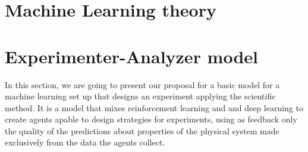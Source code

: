\documentclass[11pt,a4paper,twoside]{report}
\newcommand{\+}{\textnormal{+} }
\theoremstyle{definition}
\numberwithin{equation}{chapter}
\begin{document}
\chapter{Machine Learning theory} 

\chapter{Experimenter-Analyzer model}
In this section, we are going to present our proposal for a basic model for a
machine learning set up that designs an experiment applying the scientific 
method. It is a model that mixes reinforcement learning and and deep learning to
create agents apable to design strategies for experiments, using as feedback 
only the quality of the predictions about properties of the physical system 
made exclusively from the data the agents collect.
%
\clearpage
%
%
%
\end{document}
